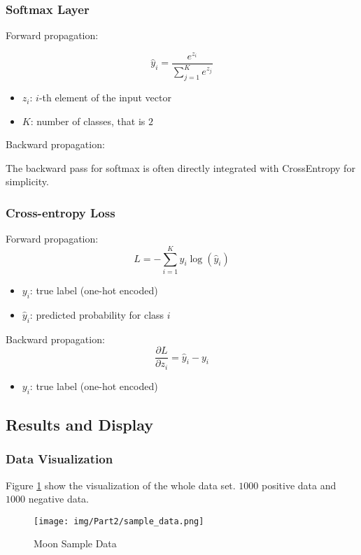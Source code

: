\subsubsection{Softmax Layer}

Forward propagation:

$$ \hat{y}_i = \frac{e^{z_i}}{\sum_{j=1}^{K} e^{z_j}} $$

\begin{itemize}
    \item $z_i$: $i$-th element of the input vector
    \item $K$: number of classes, that is $2$
\end{itemize}

Backward propagation:

The backward pass for softmax is often directly integrated with CrossEntropy for simplicity.

\subsubsection{Cross-entropy Loss}

Forward propagation:
$$ L = -\sum_{i=1}^{K} y_i \log(\hat{y}_i) $$

\begin{itemize}
    \item $y_i$: true label (one-hot encoded)
    \item $\hat{y}_i$: predicted probability for class $i$
\end{itemize}

Backward propagation:
$$ \frac{\partial L}{\partial z_i} = \hat{y}_i - y_i $$

\begin{itemize}
    \item  $y_i$: true label (one-hot encoded)
\end{itemize}

\subsection{Results and Display}

\subsubsection{Data Visualization}

Figure \ref{fig:p2sample} show the visualization of the whole data set.
$1000$ positive data and $1000$ negative data.

\begin{figure}[!ht]
    \centering
    \texttt{[image: img/Part2/sample\_data.png]}
    \caption{Moon Sample Data}
    \label{fig:p2sample}
\end{figure}

